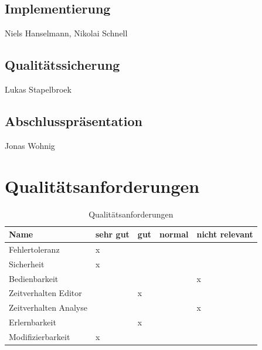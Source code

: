 \documentclass[a4paper]{scrreprt}
\begin{document}
\section{Implementierung} Niels Hanselmann, Nikolai Schnell
\section{Qualitätssicherung} Lukas Stapelbroek
\section{Abschlusspräsentation} Jonas Wohnig


\chapter{Qualitätsanforderungen}

\begin{table}[H]
  \centering
  \begin{tabular}{|P{3cm}|P{2cm}|P{2cm}|P{2cm}|P{2cm}|}
    Name & sehr gut & gut & normal & nicht relevant\\ \hline
    Fehlertoleranz & x &  &  &  \\ \hline
    Sicherheit & x &  &  &  \\ \hline
    Bedienbarkeit &  &  &  & x \\ \hline
  	Zeitverhalten Editor &  & x &  &  \\ \hline
  	Zeitverhalten Analyse &  &  &  & x \\ \hline
  	Erlernbarkeit &  & x &  &  \\ \hline 
    Modifizierbarkeit & x &  &  &  \\
  \end{tabular}
  \newline\newline
  \caption{Qualitätsanforderungen}\label{qa}
\end{table}


\printglossaries
 

 
\end{document}
